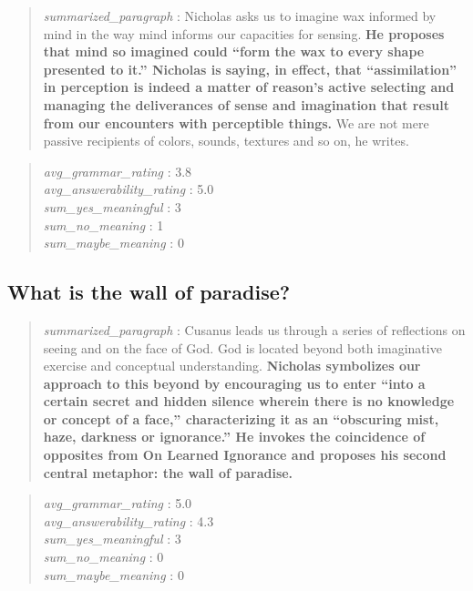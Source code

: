 \begin{quote}
\emph{summarized\_paragraph} : Nicholas asks us to imagine wax informed
by mind in the way mind informs our capacities for sensing. \textbf{He
proposes that mind so imagined could ``form the wax to every shape
presented to it.'' Nicholas is saying, in effect, that ``assimilation''
in perception is indeed a matter of reason's active selecting and
managing the deliverances of sense and imagination that result from our
encounters with perceptible things.} We are not mere passive recipients
of colors, sounds, textures and so on, he writes.
\end{quote}

\begin{quote}
\emph{avg\_grammar\_rating} : 3.8\\
\emph{avg\_answerability\_rating} : 5.0\\
\emph{sum\_yes\_meaningful} : 3\\
\emph{sum\_no\_meaning} : 1\\
\emph{sum\_maybe\_meaning} : 0
\end{quote}

\hypertarget{what-is-the-wall-of-paradise}{%
\subsection{What is the wall of
paradise?}\label{what-is-the-wall-of-paradise}}

\begin{quote}
\emph{summarized\_paragraph} : Cusanus leads us through a series of
reflections on seeing and on the face of God. God is located beyond both
imaginative exercise and conceptual understanding. \textbf{Nicholas
symbolizes our approach to this beyond by encouraging us to enter ``into
a certain secret and hidden silence wherein there is no knowledge or
concept of a face,'' characterizing it as an ``obscuring mist, haze,
darkness or ignorance.'' He invokes the coincidence of opposites from On
Learned Ignorance and proposes his second central metaphor: the wall of
paradise.}
\end{quote}

\begin{quote}
\emph{avg\_grammar\_rating} : 5.0\\
\emph{avg\_answerability\_rating} : 4.3\\
\emph{sum\_yes\_meaningful} : 3\\
\emph{sum\_no\_meaning} : 0\\
\emph{sum\_maybe\_meaning} : 0
\end{quote}

